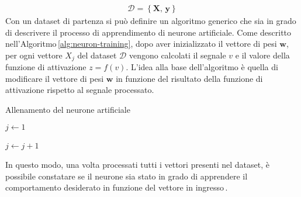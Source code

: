 % 
\begin{gather*}
    \mathcal{D} = \left\{ \mathbf{X},\, \mathbf{y} \right\}  
\end{gather*}
% 
Con un dataset di partenza si può definire un algoritmo generico che sia in grado di descrivere il processo di apprendimento di neurone artificiale. Come descritto nell'Algoritmo\,\ref{alg:neuron-training}, dopo aver inizializzato il vettore di pesi $\mathbf{w}$, per ogni vettore $X_j$ del dataset $\mathcal{D}$ vengono calcolati il segnale $v$ e il valore della funzione di attivazione $z = f(v)$. L'idea alla base dell'algoritmo è quella di modificare il vettore di pesi $\mathbf{w}$ in funzione del risultato della funzione di attivazione rispetto al segnale processato.
% 
\begin{algorithm}[ht]
    \caption{Allenamento del neurone artificiale}\label{alg:neuron-training}
    \begin{algorithmic}
        \STATE

        \STATE$j \gets 1$
        
            \STATE{}
            \STATE{}
            \STATE{}
            \STATE$j \gets j + 1$
        \ENDWHILE\,
    \end{algorithmic}
\end{algorithm}
% 
\noindent In questo modo, una volta processati tutti i vettori presenti nel dataset, è possibile constatare se il neurone sia stato in grado di apprendere il comportamento desiderato in funzione del vettore in ingresso\,\cite{flasinski2016introduction}.

